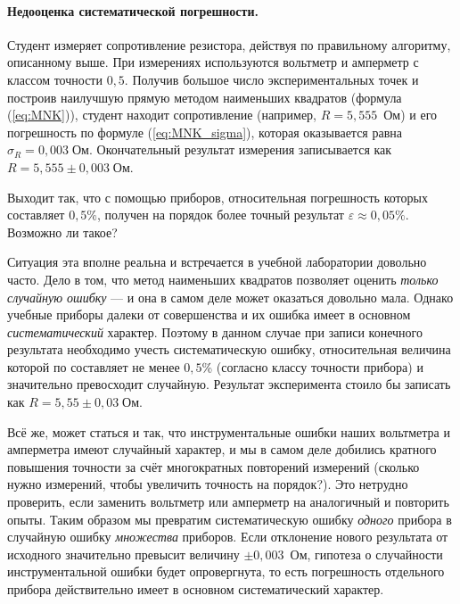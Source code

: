 \paragraph{Недооценка систематической погрешности.}

Студент измеряет сопротивление резистора, действуя по правильному
алгоритму, описанному выше. При измерениях используются вольтметр
и амперметр с классом точности $0{,}5$. Получив большое число экспериментальных
точек и построив наилучшую прямую методом наименьших квадратов (формула
(\ref{eq:MNK})), студент находит сопротивление (например, $R=5{,}555$~Ом)
и его погрешность по формуле (\ref{eq:MNK_sigma}), которая оказывается
равна $\sigma_{R}=0{,}003\;\text{Ом}.$ Окончательный результат измерения
записывается как $R=5{,}555\pm0{,}003\;\text{Ом}$.

Выходит так, что с помощью приборов, относительная погрешность которых
составляет $0{,}5\%$, получен на порядок более точный результат $\varepsilon\approx0{,}05\%$.
Возможно ли такое?

{\footnotesize
Ситуация эта вполне реальна и встречается в учебной лаборатории довольно часто. Дело в
том, что метод наименьших квадратов позволяет оценить \emph{только
случайную ошибку} --- и она в самом деле может оказаться довольно мала. Однако
учебные приборы далеки от совершенства и их ошибка имеет в основном
\emph{систематический} характер. Поэтому в данном случае при записи конечного результата
необходимо учесть систематическую ошибку, относительная величина которой по составляет
не менее $0{,}5$\% (согласно классу точности прибора) и значительно превосходит
случайную. Результат эксперимента стоило бы записать как $R=5{,}55\pm0{,}03\;\text{Ом}$.

Всё же, может статься и так, что инструментальные
ошибки наших вольтметра и амперметра имеют случайный характер, и мы
в самом деле добились кратного повышения точности за счёт многократных
повторений измерений (сколько нужно измерений, чтобы увеличить точность
на порядок?). Это нетрудно проверить, если заменить вольтметр или
амперметр на аналогичный и повторить опыты. Таким образом мы превратим
систематическую ошибку \emph{одного} прибора в случайную ошибку \emph{множества} 
приборов. Если отклонение нового результата от исходного значительно
превысит величину $\pm0{,}003$~Ом, гипотеза о случайности инструментальной
ошибки будет опровергнута, то есть погрешность отдельного прибора
действительно имеет в основном систематический характер.\par
}%

